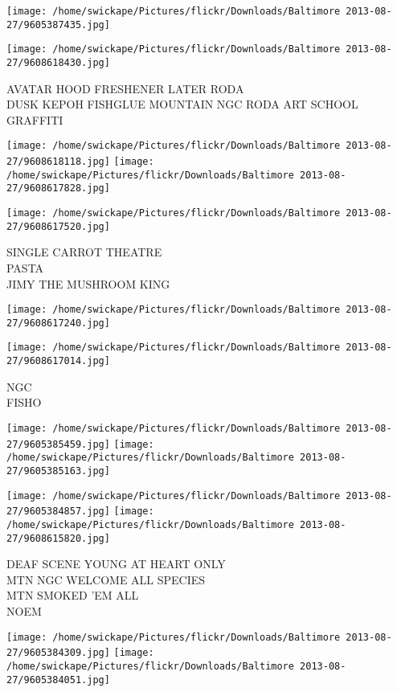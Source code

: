 \documentclass[10pt,letterpaper]{article}
\begin{document}
\texttt{[image: /home/swickape/Pictures/flickr/Downloads/Baltimore 2013-08-27/9605387435.jpg]}

\vspace{0.25in}
\texttt{[image: /home/swickape/Pictures/flickr/Downloads/Baltimore 2013-08-27/9608618430.jpg]}

AVATAR HOOD FRESHENER LATER RODA\\
DUSK KEPOH FISHGLUE MOUNTAIN NGC RODA ART SCHOOL GRAFFITI
\pagebreak

\texttt{[image: /home/swickape/Pictures/flickr/Downloads/Baltimore 2013-08-27/9608618118.jpg]}
\texttt{[image: /home/swickape/Pictures/flickr/Downloads/Baltimore 2013-08-27/9608617828.jpg]}

\texttt{[image: /home/swickape/Pictures/flickr/Downloads/Baltimore 2013-08-27/9608617520.jpg]}

SINGLE CARROT THEATRE\\
PASTA\\
JIMY THE MUSHROOM KING
\pagebreak

\texttt{[image: /home/swickape/Pictures/flickr/Downloads/Baltimore 2013-08-27/9608617240.jpg]}

\vspace{0.25in}
\texttt{[image: /home/swickape/Pictures/flickr/Downloads/Baltimore 2013-08-27/9608617014.jpg]}

NGC\\
FISHO
\pagebreak

\texttt{[image: /home/swickape/Pictures/flickr/Downloads/Baltimore 2013-08-27/9605385459.jpg]}
\texttt{[image: /home/swickape/Pictures/flickr/Downloads/Baltimore 2013-08-27/9605385163.jpg]}

\texttt{[image: /home/swickape/Pictures/flickr/Downloads/Baltimore 2013-08-27/9605384857.jpg]}
\texttt{[image: /home/swickape/Pictures/flickr/Downloads/Baltimore 2013-08-27/9608615820.jpg]}

DEAF SCENE YOUNG AT HEART ONLY\\
MTN NGC WELCOME ALL SPECIES\\
MTN SMOKED 'EM ALL\\
NOEM
\pagebreak

\texttt{[image: /home/swickape/Pictures/flickr/Downloads/Baltimore 2013-08-27/9605384309.jpg]}
\texttt{[image: /home/swickape/Pictures/flickr/Downloads/Baltimore 2013-08-27/9605384051.jpg]}
\end{document}
